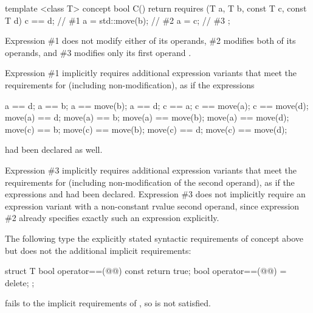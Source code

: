 \begin{addedblock}

\enterexample
\begin{codeblock}
template <class T>
concept bool C() {
  return requires (T a, T b, const T c, const T d) {
    c == d;       // \#1
    a = std::move(b);  // \#2
    a = c;        // \#3
  };
}
\end{codeblock}

Expression \#1 does not modify either of its operands, \#2 modifies both of its
operands, and \#3 modifies only its first operand .

Expression \#1 implicitly requires additional expression variants that meet the
requirements for  (including non-modification), as if the expressions
\begin{codeblock}
a == d;       a == b;             a == move(b);       a == d;
c == a;       c == move(a);       c == move(d);
move(a) == d; move(a) == b;       move(a) == move(b); move(a) == move(d);
move(c) == b; move(c) == move(b); move(c) == d;       move(c) == move(d);
\end{codeblock}
had been declared as well.

Expression \#3 implicitly requires additional expression variants that meet the
requirements for  (including non-modification of the second operand),
as if the expressions  and  had been declared.
Expression \#3 does not implicitly require an expression variant with a
non-constant rvalue second operand, since expression \#2 already specifies exactly
such an expression explicitly.
\exitexample

\enterexample
The following type   the explicitly stated syntactic requirements
of concept  above but does not  the additional implicit requirements:

\begin{codeblock}
struct T {
  bool operator==(@@) const { return true; }
  bool operator==(@@) = delete;
};
\end{codeblock}

 fails to  the implicit
requirements of , so  is not satisfied.
 
\exitexample


\end{addedblock}
